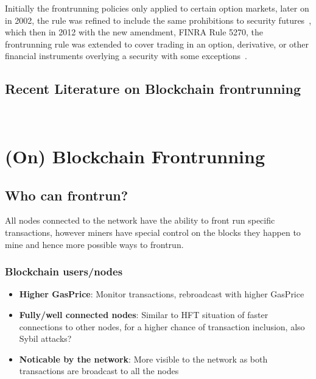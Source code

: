 Initially the frontrunning policies only applied to certain option markets, later on in 2002, the rule was refined to include the same prohibitions to security futures~\cite{finra_2002}, which then in 2012 with the new amendment, FINRA Rule 5270, the frontrunning rule was extended to cover trading in an option, derivative, or other financial instruments overlying a security with some exceptions~\cite{finra_2012, sec2012frontrunning}. 


\subsection{Recent Literature on Blockchain frontrunning}

~\cite{malinova2017market}
~\cite{aune2017footprints}
~\cite{breidenbach2018enter}






\section{(On) Blockchain Frontrunning}

\subsection{Who can frontrun?}

All nodes connected to the network have the ability to front run specific transactions, however miners have special control on the blocks they happen to mine and hence more possible ways to frontrun.

\subsubsection{Blockchain users/nodes}

\begin{itemize}
\item{\textbf{Higher GasPrice}: Monitor transactions, rebroadcast with higher GasPrice}
\item{\textbf{Fully/well connected nodes}: Similar to HFT situation of faster connections to other nodes, for a higher chance of transaction inclusion, also Sybil attacks?} 
\item{\textbf{Noticable by the network}: More visible to the network as both transactions are broadcast to all the nodes}
\end{itemize}


